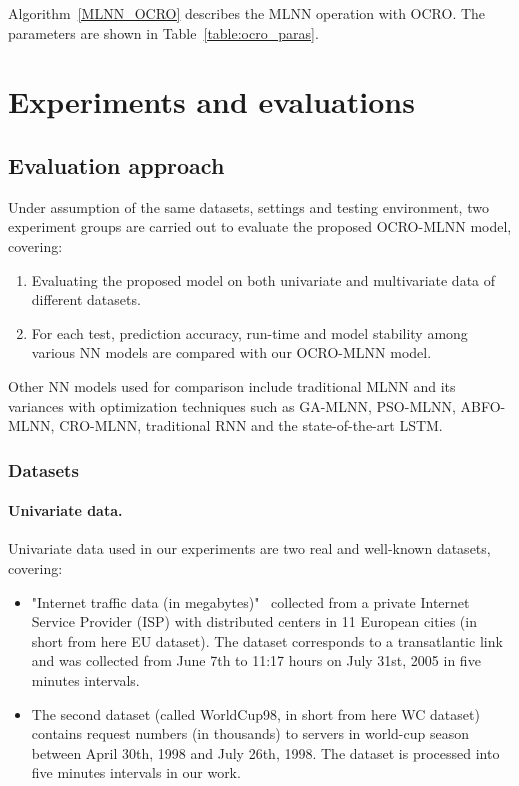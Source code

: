\documentclass[11pt,twoside]{article}
\begin{document}
\begin{multicols}{2}
Algorithm~\ref{MLNN_OCRO} describes the MLNN operation with OCRO. The parameters are shown in Table~\ref{table:ocro_paras}.


\section{Experiments and evaluations}
\label{experiments}

\subsection{Evaluation approach}
Under assumption of the same datasets, settings and testing environment, two experiment groups are carried out to evaluate the proposed OCRO-MLNN model, covering:

\begin{enumerate}
	\item Evaluating the proposed model on both univariate and multivariate data of different datasets.
	\item For each test, prediction accuracy, run-time and model stability among various NN models are compared with our OCRO-MLNN model. 
\end{enumerate}

Other NN models used for comparison include traditional MLNN and its variances with optimization techniques such as GA-MLNN, PSO-MLNN, ABFO-MLNN, CRO-MLNN, traditional RNN and the state-of-the-art LSTM.

\subsubsection{Datasets}
\label{dataset}

\paragraph{\textbf{Univariate data.}} Univariate data used in our experiments are two real and well-known datasets, covering:

\begin{itemize}
	\item "Internet traffic data (in megabytes)"~\citep{ref_cortez} collected from a private Internet Service Provider (ISP) with distributed centers in 11 European cities (in short from here EU dataset). The dataset corresponds to a transatlantic link and was collected from June 7th to 11:17 hours on July 31st, 2005 in five minutes intervals. 
	\item The second dataset (called WorldCup98, in short from here WC dataset) contains request numbers (in thousands) to servers in world-cup season between April 30th, 1998 and July 26th, 1998. The dataset is processed into five minutes intervals in our work.
\end{itemize}


\end{multicols}
\end{document}
